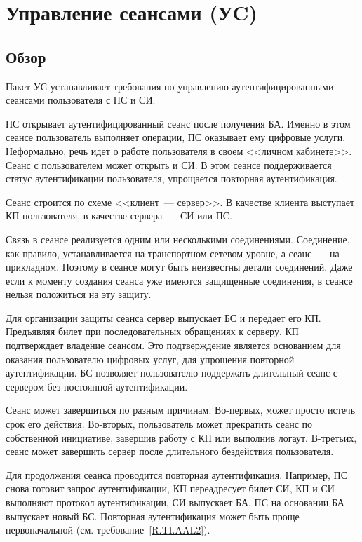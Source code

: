 \section{Управление сеансами (УC)}\label{SM}


\subsection{Обзор}\label{SM.Intro}

Пакет УС устанавливает требования по управлению аутентифицированными сеансами 
пользователя с ПС и СИ.

ПС открывает аутентифицированный сеанс после получения БА. Именно в этом сеансе 
пользователь выполняет операции, ПС оказывает ему цифровые услуги. Неформально, 
речь идет о работе пользователя в своем <<личном кабинете>>.
%
Сеанс с пользователем может открыть и СИ. В этом сеансе поддерживается статус
аутентификации пользователя, упрощается повторная аутентификация.

Сеанс строится по схеме <<клиент~--- сервер>>. В качестве клиента выступает КП
пользователя, в качестве сервера~--- СИ или ПС.

Связь в сеансе реализуется одним или несколькими соединениями. 
%
Соединение, как правило, устанавливается на транспортном 
сетевом уровне, а сеанс~--- на прикладном. Поэтому в сеансе могут
быть неизвестны детали соединений.
%
Даже если к моменту создания сеанса уже имеются защищенные соединения,
в сеансе нельзя положиться на эту защиту.

Для организации защиты сеанса сервер выпускает БС и передает его КП. 
Предъявляя билет при последовательных обращениях к серверу,
КП подтверждает владение сеансом. Это подтверждение является основанием
для оказания пользователю цифровых услуг, для упрощения повторной 
аутентификации. БС позволяет пользователю поддержать длительный 
сеанс с сервером без постоянной аутентификации.  

Сеанс может завершиться по разным причинам. Во-первых, может просто истечь
срок его действия. Во-вторых, пользователь может прекратить сеанс по 
собственной инициативе, завершив работу с КП или выполнив логаут. В-третьих, 
сеанс может завершить сервер после длительного бездействия пользователя. 

Для продолжения сеанса проводится повторная аутентификация.
Например, ПС снова готовит запрос аутентификации, КП переадресует билет 
СИ, КП и СИ выполняют протокол аутентификации, СИ выпускает БА,
ПС на основании БА выпускает новый БС.
%
Повторная аутентификация может быть проще первоначальной
(см. требование~\ref{R.TI.AAL2}).
%

